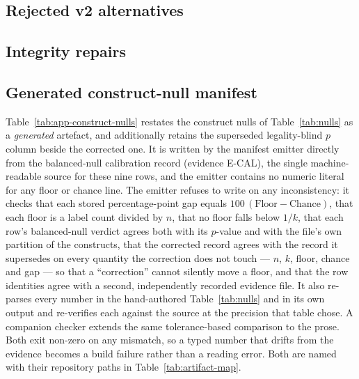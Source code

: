 

\FloatBarrier

\subsection{Rejected v2 alternatives}



\FloatBarrier

\subsection{Integrity repairs}



\FloatBarrier

\subsection{Generated construct-null manifest}
\label{app:generated-nulls}

Table~\ref{tab:app-construct-nulls} restates the construct nulls of
Table~\ref{tab:nulls} as a \emph{generated} artefact, and additionally retains the
superseded legality-blind $p$ column beside the corrected one. It is written by
the manifest emitter directly from the balanced-null calibration record
(evidence \textsf{E-CAL}), the single
machine-readable source for these nine rows, and the emitter contains no numeric
literal for any floor or chance line. The emitter refuses to write on any
inconsistency: it checks that each stored percentage-point gap equals
$100\,(\text{Floor}-\text{Chance})$, that each floor is a label count divided by
$n$, that no floor falls below $1/k$, that each row's balanced-null verdict
agrees both with its $p$-value and with the file's own partition of the
constructs, that the corrected record agrees with the record it supersedes on
every quantity the correction does not touch --- $n$, $k$, floor, chance and gap
--- so that a ``correction'' cannot silently move a floor, and that the row
identities agree with a second, independently recorded evidence file. It also
re-parses every number in the hand-authored
Table~\ref{tab:nulls} and in its own output and re-verifies each against the
source at the precision that table chose. A companion checker extends the same
tolerance-based comparison to the prose. Both exit non-zero on any mismatch, so a
typed number that drifts from the evidence becomes a build failure rather than a
reading error. Both are named with their repository paths in
Table~\ref{tab:artifact-map}.

